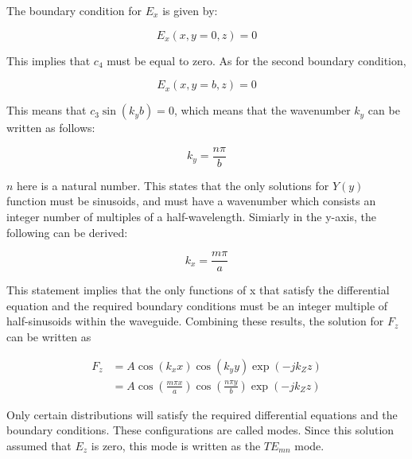 \documentclass[a4paper,12pt]{report}
\begin{document}
The boundary condition for $E_x$ is given by:

\begin{equation}
  E_x(x, y=0, z) = 0
\end{equation}

This implies that $c_4$ must be equal to zero.
As for the second boundary condition,

\begin{equation}
  E_x(x, y=b, z) = 0
\end{equation}

This means that $c_3 \sin (k_y b) = 0$, which means that the wavenumber $k_y$
can be written as follows:

\begin{equation} \label{eq:wavenumber_y}
  k_y = \frac{n\pi}{b}
\end{equation}

$n$ here is a natural number.
This states that the only solutions for $Y(y)$ function must be sinusoids,
and must have a wavenumber
which consists an integer number of multiples of a half-wavelength.
Simiarly in the y-axis, the following can be derived:

\begin{equation} \label{eq:wavenumber_x}
  k_x = \frac{m\pi}{a}
\end{equation}

This statement implies that the only functions of x that satisfy
the differential equation and the required boundary conditions
must be an integer multiple of half-sinusoids within the waveguide.
Combining these results, the solution for $F_z$ can be written as

\begin{equation}
  \begin{split}
    F_z &= A \cos(k_x x)\cos(k_y y)\exp(-j k_Z z) \\
        & = A \cos(\frac{m\pi x}{a}) \cos(\frac{n \pi y}{b})\exp(-j k_Z z)
  \end{split}
\end{equation}

Only certain distributions will satisfy the required differential equations
and the boundary conditions. These configurations are called modes.
Since this solution assumed that $E_z$ is zero, this mode is written as the $TE_{mn}$ mode.
\end{document}

